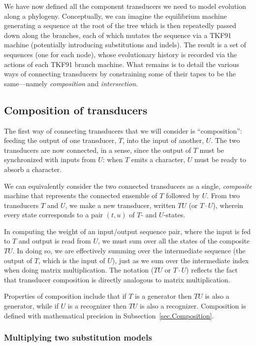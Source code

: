 \documentclass{article}
\newcommand{\secref}[1]{Subsection~\ref{sec.#1}}
\newcommand{\seclabel}[1]{\label{sec.#1}}
\begin{document}
We have now defined all the component transducers we need to model evolution along a phylogeny. 
Conceptually, we can imagine the equilibrium machine generating a sequence at the root of the
tree which is then repeatedly passed down along the branches, each of which mutates the sequence
via a TKF91 machine (potentially introducing substitutions and indels). 
The result is a set of sequences (one  for each node),
  whose evolutionary history is recorded via  
the actions of each TKF91  branch machine.  
What remains is to detail the various ways of connecting transducers by
 constraining some of their tapes to be the same---namely {\em composition} and {\em intersection}.

\subsection{Composition of transducers}
\seclabel{Tutorial.Composition}
The first way of connecting transducers that we will consider is  ``composition'':
feeding the output of one transducer, $T$, into the input of another, $U$.
The two transducers are now connected, in a sense, since the output of $T$ must be
 synchronized with inputs from $U$: when $T$ emits a character, $U$ must be ready to absorb a character.  

We can equivalently  consider the two connected transducers as
a single, {\em composite} machine that represents
 the connected ensemble of $T$ followed by $U$.  
From two transducers $T$ and $U$,
we make a new transducer, written $TU$ (or $T \cdot U$),
wherein every state corresponds to a pair $(t,u)$ of $T$- and $U$-states.  
 
In computing the weight of an input/output sequence pair, where the input is fed to $T$ and
output is read from $U$, we must sum over all the states of the composite $TU$.  
In doing so, we are effectively summing over the intermediate sequence
(the output of $T$, which is the input of $U$),
just as we sum over the intermediate index when doing matrix multiplication.
The notation ($TU$ or $T \cdot U$) reflects the fact that transducer composition is  directly 
analogous to  matrix multiplication.  

Properties of composition include that
if $T$ is a generator then $TU$ is also a generator, while
if $U$ is a recognizer then $TU$ is also a recognizer.
Composition is defined with mathematical precision in \secref{Composition}. 

\subsubsection{Multiplying two substitution models}
\end{document}
